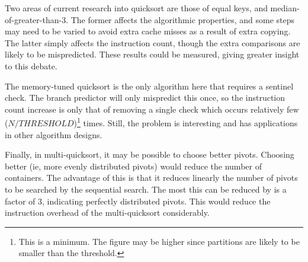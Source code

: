 Two areas of current research into quicksort are those of equal keys, and
median-of-greater-than-3. The former affects the algorithmic properties, and
some steps may need to be varied to avoid extra cache misses as a result
of extra copying. The latter simply affects the instruction count, though the
extra comparisons are likely to be mispredicted. These results could be
measured, giving greater insight to this debate.

The memory-tuned quicksort is the only algorithm here that requires a sentinel
check. The branch predictor will only mispredict this once, so the instruction
count increase is only that of removing a single check which occurs relatively
few ($N / THRESHOLD$)\footnote{This is a minimum. The figure may be higher since
partitions are likely to be smaller than the threshold.} times. Still, the
problem is interesting and has applications in other algorithm designs.

Finally, in multi-quicksort, it may be possible to choose better pivots.
Choosing better (ie, more evenly distributed pivots) would reduce the number of
containers. The advantage of this is that it reduces linearly the number of
pivots to be searched by the sequential search. The most this can be reduced by
is a factor of 3, indicating perfectly distributed pivots. This would reduce the
instruction overhead of the multi-quicksort considerably.
